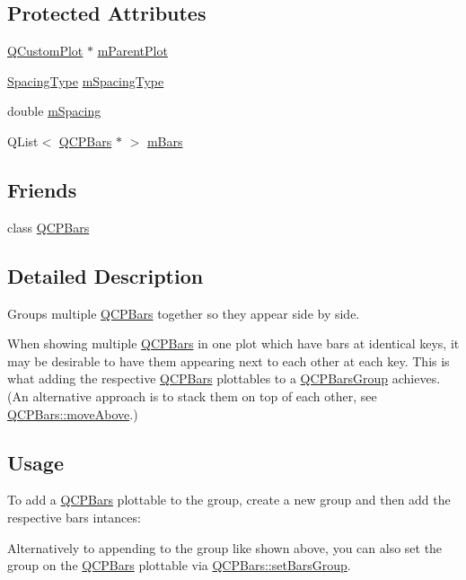 \subsection*{Protected Attributes}
\begin{DoxyCompactItemize}
\item 
\hyperlink{class_q_custom_plot}{Q\+Custom\+Plot} $\ast$ \hyperlink{class_q_c_p_bars_group_a973d408cfbf88db95115aec71877f9e7}{m\+Parent\+Plot}
\item 
\hyperlink{class_q_c_p_bars_group_a4c0521120a97e60bbca37677a37075b6}{Spacing\+Type} \hyperlink{class_q_c_p_bars_group_a6794ee1a9c81864d627bff6a4b2d64ec}{m\+Spacing\+Type}
\item 
double \hyperlink{class_q_c_p_bars_group_a56471d7f548ca6141b7a5bf9629f7ece}{m\+Spacing}
\item 
Q\+List$<$ \hyperlink{class_q_c_p_bars}{Q\+C\+P\+Bars} $\ast$ $>$ \hyperlink{class_q_c_p_bars_group_affdb1e9233c277ff5a4c0a1121cf1fc0}{m\+Bars}
\end{DoxyCompactItemize}
\subsection*{Friends}
\begin{DoxyCompactItemize}
\item 
class \hyperlink{class_q_c_p_bars_group_a721b87c7cdb8e83a90d77fc8a22e7195}{Q\+C\+P\+Bars}
\end{DoxyCompactItemize}


\subsection{Detailed Description}
Groups multiple \hyperlink{class_q_c_p_bars}{Q\+C\+P\+Bars} together so they appear side by side. 



When showing multiple \hyperlink{class_q_c_p_bars}{Q\+C\+P\+Bars} in one plot which have bars at identical keys, it may be desirable to have them appearing next to each other at each key. This is what adding the respective \hyperlink{class_q_c_p_bars}{Q\+C\+P\+Bars} plottables to a \hyperlink{class_q_c_p_bars_group}{Q\+C\+P\+Bars\+Group} achieves. (An alternative approach is to stack them on top of each other, see \hyperlink{class_q_c_p_bars_ac22e00a6a41509538c21b04f0a57318c}{Q\+C\+P\+Bars\+::move\+Above}.)\hypertarget{class_q_c_p_bars_group_qcpbarsgroup-usage}{}\subsection{Usage}\label{class_q_c_p_bars_group_qcpbarsgroup-usage}
To add a \hyperlink{class_q_c_p_bars}{Q\+C\+P\+Bars} plottable to the group, create a new group and then add the respective bars intances\+: 
\begin{DoxyCodeInclude}
\end{DoxyCodeInclude}
Alternatively to appending to the group like shown above, you can also set the group on the \hyperlink{class_q_c_p_bars}{Q\+C\+P\+Bars} plottable via \hyperlink{class_q_c_p_bars_aedd1709061f0b307c47ddb45e172ef9a}{Q\+C\+P\+Bars\+::set\+Bars\+Group}.

